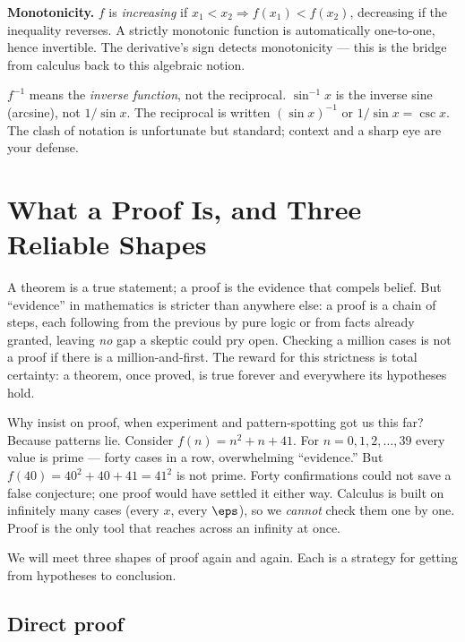 \textbf{Monotonicity.} $f$ is \emph{increasing} if $x_1<x_2 \Rightarrow
f(x_1)<f(x_2)$, decreasing if the inequality reverses. A strictly monotonic
function is automatically one-to-one, hence invertible. The derivative's sign
detects monotonicity --- this is the bridge from calculus back to this algebraic
notion.

\begin{trapbox}
$f^{-1}$ means the \emph{inverse function}, not the reciprocal. $\sin^{-1}x$ is the
inverse sine (arcsine), not $1/\sin x$. The reciprocal is written $(\sin x)^{-1}$
or $1/\sin x = \csc x$. The clash of notation is unfortunate but standard; context
and a sharp eye are your defense.
\end{trapbox}

\section{What a Proof Is, and Three Reliable Shapes}
\label{ch40:proof}

A theorem is a true statement; a proof is the evidence that compels belief. But
``evidence'' in mathematics is stricter than anywhere else: a proof is a chain of
steps, each following from the previous by pure logic or from facts already
granted, leaving \emph{no} gap a skeptic could pry open. Checking a million cases
is not a proof if there is a million-and-first. The reward for this strictness is
total certainty: a theorem, once proved, is true forever and everywhere its
hypotheses hold.

\begin{aestheticbox}
Why insist on proof, when experiment and pattern-spotting got us this far?
Because patterns lie. Consider $f(n) = n^2 + n + 41$. For $n=0,1,2,\dots,39$ every
value is prime --- forty cases in a row, overwhelming ``evidence.'' But
$f(40)=40^2+40+41 = 41^2$ is not prime. Forty confirmations could not save a false
conjecture; one proof would have settled it either way. Calculus is built on
infinitely many cases (every $x$, every $\eps$), so we \emph{cannot} check them
one by one. Proof is the only tool that reaches across an infinity at once.
\end{aestheticbox}

We will meet three shapes of proof again and again. Each is a strategy for getting
from hypotheses to conclusion.

\subsection{Direct proof}

